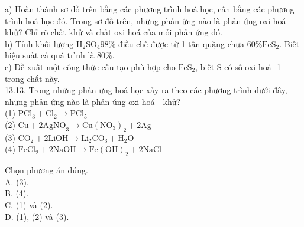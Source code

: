 \documentclass[10pt]{article}
\begin{document}
a) Hoàn thành sơ đồ trên bằng các phương trình hoá học, cân bằng các phương trình hoá học đó. Trong sơ đồ trên, những phản ứng nào là phản ứng oxi hoá - khử? Chỉ rõ chất khử và chất oxi hoá của mỗi phản ứng đó.\\
b) Tính khối lượng $\mathrm{H}_{2} \mathrm{SO}_{4} 98 \%$ điều chế được từ 1 tấn quặng chưa $60 \% \mathrm{FeS}_{2}$. Biết hiệu suất cả quá trình là $80 \%$.\\
c) Đề xuất một công thức cấu tạo phù hợp cho $\mathrm{FeS}_{2}$, biết S có số oxi hoá -1 trong chất này.\\
13.13. Trong những phản ưng hoá học xảy ra theo các phương trình dưới đây, những phản ứng nào là phản úng oxi hoá - khử?\\
(1) $\mathrm{PCl}_{3}+\mathrm{Cl}_{2} \rightarrow \mathrm{PCl}_{5}$\\
(2) $\mathrm{Cu}+2 \mathrm{AgNO}_{3} \rightarrow \mathrm{Cu}\left(\mathrm{NO}_{3}\right)_{2}+2 \mathrm{Ag}$\\
(3) $\mathrm{CO}_{2}+2 \mathrm{LiOH} \rightarrow \mathrm{Li}_{2} \mathrm{CO}_{3}+\mathrm{H}_{2} \mathrm{O}$\\
(4) $\mathrm{FeCl}_{2}+2 \mathrm{NaOH} \rightarrow \mathrm{Fe}(\mathrm{OH})_{2}+2 \mathrm{NaCl}$

Chọn phương án đúng.\\
A. (3).\\
B. (4).\\
C. (1) và (2).\\
D. (1), (2) và (3).
\end{document}
